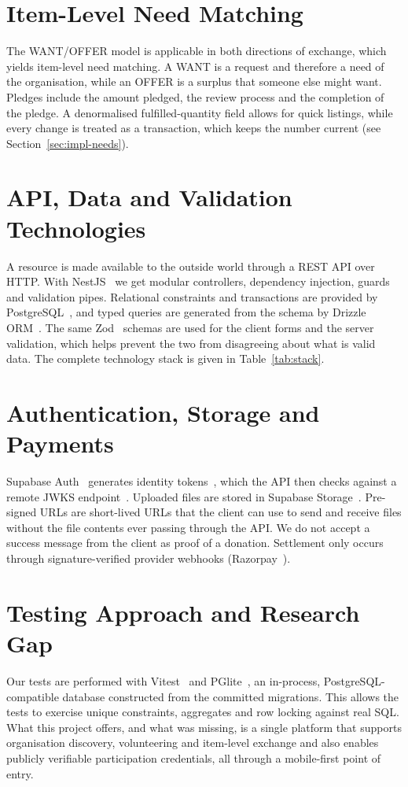 \section{Item-Level Need Matching}
The WANT/OFFER model is applicable in both directions of exchange, which yields item-level need matching. A WANT is a request and therefore a need of the organisation, while an OFFER is a surplus that someone else might want. Pledges include the amount pledged, the review process and the completion of the pledge. A denormalised fulfilled-quantity field allows for quick listings, while every change is treated as a transaction, which keeps the number current (see Section~\ref{sec:impl-needs}).

\section{API, Data and Validation Technologies}
A resource is made available to the outside world through a REST API over HTTP. With NestJS~\cite{nestjs} we get modular controllers, dependency injection, guards and validation pipes. Relational constraints and transactions are provided by PostgreSQL~\cite{postgresql}, and typed queries are generated from the schema by Drizzle ORM~\cite{drizzle}. The same Zod~\cite{zod} schemas are used for the client forms and the server validation, which helps prevent the two from disagreeing about what is valid data. The complete technology stack is given in Table~\ref{tab:stack}.

\section{Authentication, Storage and Payments}
Supabase Auth~\cite{supabase} generates identity tokens~\cite{jwt}, which the API then checks against a remote JWKS endpoint~\cite{jwk}. Uploaded files are stored in Supabase Storage~\cite{supabase}. Pre-signed URLs are short-lived URLs that the client can use to send and receive files without the file contents ever passing through the API. We do not accept a success message from the client as proof of a donation. Settlement only occurs through signature-verified provider webhooks (Razorpay~\cite{razorpay}).

\section{Testing Approach and Research Gap}
Our tests are performed with Vitest~\cite{vitest} and PGlite~\cite{pglite}, an in-process, PostgreSQL-compatible database constructed from the committed migrations. This allows the tests to exercise unique constraints, aggregates and row locking against real SQL. What this project offers, and what was missing, is a single platform that supports organisation discovery, volunteering and item-level exchange and also enables publicly verifiable participation credentials, all through a mobile-first point of entry.

